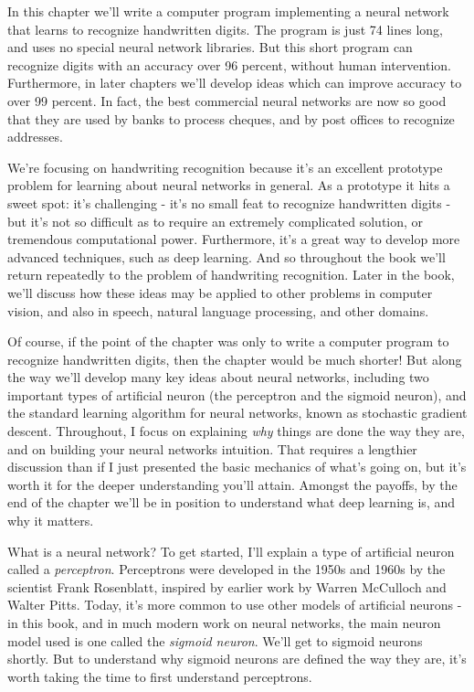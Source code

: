 In this chapter we'll write a computer program implementing a neural network that learns to recognize handwritten digits. The program is just 74 lines long, and uses no special neural network libraries. But this short program can recognize digits with an accuracy over 96 percent, without human intervention. Furthermore, in later chapters we'll develop ideas which can improve accuracy to over 99 percent. In fact, the best commercial neural networks are now so good that they are used by banks to process cheques, and by post offices to recognize addresses.


We're focusing on handwriting recognition because it's an excellent prototype problem for learning about neural networks in general. As a prototype it hits a sweet spot: it's challenging - it's no small feat to recognize handwritten digits - but it's not so difficult as to require an extremely complicated solution, or tremendous computational power. Furthermore, it's a great way to develop more advanced techniques, such as deep learning. And so throughout the book we'll return repeatedly to the problem of handwriting recognition. Later in the book, we'll discuss how these ideas may be applied to other problems in computer vision, and also in speech, natural language processing, and other domains.


Of course, if the point of the chapter was only to write a computer program to recognize handwritten digits, then the chapter would be much shorter! But along the way we'll develop many key ideas about neural networks, including two important types of artificial neuron (the perceptron and the sigmoid neuron), and the standard learning algorithm for neural networks, known as stochastic gradient descent. Throughout, I focus on explaining \emph{why} things are done the way they are, and on building your neural networks intuition. That requires a lengthier discussion than if I just presented the basic mechanics of what's going on, but it's worth it for the deeper understanding you'll attain. Amongst the payoffs, by the end of the chapter we'll be in position to understand what deep learning is, and why it matters.





What is a neural network? To get started, I'll explain a type of artificial neuron called a \emph{perceptron}. Perceptrons were developed in the 1950s and 1960s by the scientist Frank Rosenblatt, inspired by earlier work by Warren McCulloch and Walter Pitts. Today, it's more common to use other models of artificial neurons - in this book, and in much modern work on neural networks, the main neuron model used is one called the \emph{sigmoid neuron}. We'll get to sigmoid neurons shortly. But to understand why sigmoid neurons are defined the way they are, it's worth taking the time to first understand perceptrons.


